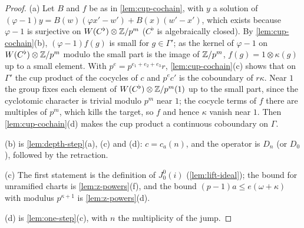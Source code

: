 \begin{proof}
(a) Let $B$ and $f$ be as in \cref{lem:cup-cochain}, with $y$ a solution of $(\varphi-1)y=B(w)(\varphi x'-w')+B(x)(w'-x')$, which exists because $\varphi-1$ is surjective on $W(C^\flat)\otimes\mathbb{Z}/p^m$ ($C^\flat$ is algebraically closed). By \cref{lem:cup-cochain}(b), $(\varphi-1)f(g)$ is small for $g\in\Gamma'$; as the kernel
of $\varphi-1$ on $W(C^\flat)\otimes\mathbb{Z}/p^m$ modulo the small part is the image of $\mathbb{Z}/p^m$, $f(g)=1\otimes\kappa(g)$ up to a small element. With $p^e=p^{e_1+e_2+e_3}r$, \cref{lem:cup-cochain}(c) shows that on $\Gamma'$ the cup product of the cocycles of $c$ and $p^ec'$ is the coboundary of
$r\kappa$. Near $1$ the group fixes each element of $W(C^\flat)\otimes\mathbb{Z}/p^m(1)$ up to the small part, since the cyclotomic character is trivial modulo $p^m$ near $1$; the cocycle terms of $f$ there are multiples of $p^m$, which kills the target, so $f$ and hence $\kappa$ vanish near $1$. Then
\cref{lem:cup-cochain}(d) makes the cup product a continuous coboundary on $\Gamma$.

(b) is \cref{lem:depth-step}(a), (c) and (d): $c=c_a(n)$, and the operator is $D_n$ (or $D_0$), followed by the retraction.

(c) The first statement is the definition of $J^0_0(i)$ (\cref{lem:lift-ideal}); the bound for unramified charts is \cref{lem:z-powers}(f), and the bound $(p-1)a\le e(\omega+\kappa)$ with modulus $p^{\kappa+1}$ is \cref{lem:z-powers}(d).

(d) is \cref{lem:one-step}(c), with $n$ the multiplicity of the jump.
\end{proof}

